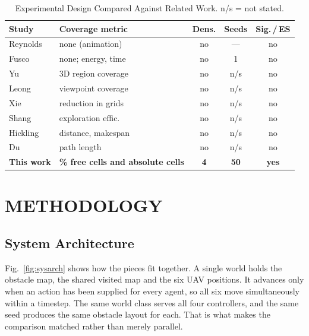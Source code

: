 \documentclass[a4paper, 10pt, conference]{ieeeconf}
\begin{document}
\begin{table}[htb]
\centering
\caption{Experimental Design Compared Against Related Work.
n/s = not stated.}
\label{tab:related}
\scriptsize
\setlength{\tabcolsep}{3pt}
\begin{tabular}{llccc}
\toprule
\textbf{Study} & \textbf{Coverage metric} & \textbf{Dens.} &
\textbf{Seeds} & \textbf{Sig.\,/\,ES} \\
\midrule
Reynolds~\cite{reynolds1987} & none (animation) & no & --- & no \\
Fusco~\cite{fusco2025}       & none; energy, time & no & 1 & no \\
Yu~\cite{yu2025}             & 3D region coverage & no & n/s & no \\
Leong~\cite{leong2024}       & viewpoint coverage & no & n/s & no \\
Xie~\cite{xie2025}           & reduction in grids & no & n/s & no \\
Shang~\cite{shang2025}       & exploration effic. & no & n/s & no \\
Hickling~\cite{hickling2025} & distance, makespan & no & n/s & no \\
Du~\cite{du2023}             & path length & no & n/s & no \\
\midrule
\textbf{This work} & \textbf{\% free cells and absolute cells} &
\textbf{4} & \textbf{50} & \textbf{yes} \\
\bottomrule
\end{tabular}
\end{table}

\section{METHODOLOGY}\label{sec:methodology}

\subsection{System Architecture}\label{sec:arch}

Fig.~\ref{fig:sysarch} shows how the pieces fit together. A single
world holds the obstacle map, the shared visited map and the six UAV
positions. It advances only when an action has been supplied for every
agent, so all six move simultaneously within a timestep. The same
world class serves all four controllers, and the same seed produces
the same obstacle layout for each. That is what makes the comparison
matched rather than merely parallel.
\end{document}
